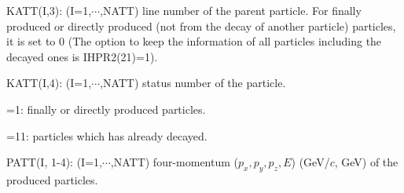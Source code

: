 \begin{description}
\item{}KATT(I,3): (I=1,$\cdots$,NATT) line number of the parent particle.
                        For finally produced or directly produced (not from
                        the decay of another particle) particles, it is set
                        to 0 (The option to keep the information of all
                        particles including the decayed ones is IHPR2(21)=1).
\item{}KATT(I,4): (I=1,$\cdots$,NATT) status number of the particle.
        \vspace{-12.0pt}
        \begin{description}
        \itemsep=-4.0pt
               \item{}=1: finally or directly produced particles.
               \item{}=11: particles which has already decayed.
        \end{description}
        \vspace{-4.0pt}
\item{}PATT(I, 1-4): (I=1,$\cdots$,NATT) four-momentum ($p_x,p_y,p_z,E$) 
                (GeV/$c$, GeV) of the produced particles.
\end{description}


